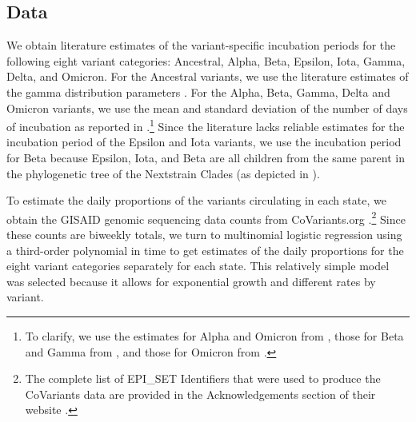 \documentclass{article}
\begin{document}

\subsection{Data} 

We obtain literature estimates of the variant-specific incubation periods
for the following eight variant categories: Ancestral, Alpha, Beta, Epsilon, Iota, 
Gamma, Delta, and Omicron.
For the Ancestral variants, we use the
literature estimates of the gamma distribution parameters \citep{tindale2020evidence}. 
For the Alpha, Beta, Gamma, Delta and Omicron variants, we use the
mean and standard deviation of the number of days of incubation as reported in
\citet{tanaka2022shorter, grant2022impact, ogata2022shorter}.\footnote{To clarify, 
we use the estimates for Alpha and Omicron from \citet{tanaka2022shorter}, those for
Beta and Gamma from \citet{grant2022impact}, and those for Omicron from
\citet{ogata2022shorter}.} Since the literature lacks reliable estimates for the incubation
period of the Epsilon and Iota variants, we use the
incubation period for Beta because Epsilon, Iota, and Beta are all
children from the same parent in the phylogenetic tree of the Nextstrain Clades
(as depicted in \citealp{hodcroft2021covariants}). 

To estimate the daily proportions of the variants circulating in each state, we
obtain the GISAID genomic sequencing data counts from CoVariants.org
\citep{hodcroft2021covariants, elbe2017data}.\footnote{The complete list of
EPI\_SET Identifiers that were used to produce the CoVariants data are provided
in the Acknowledgements section of their website
\citep{hodcroft2021covariants}.} Since these counts are biweekly totals, we turn to
multinomial logistic regression using a third-order polynomial in time to get 
estimates of the daily proportions for the eight variant categories separately for each state.
 This relatively simple model was selected because it allows for exponential growth 
 and different rates by variant.
\end{document}

